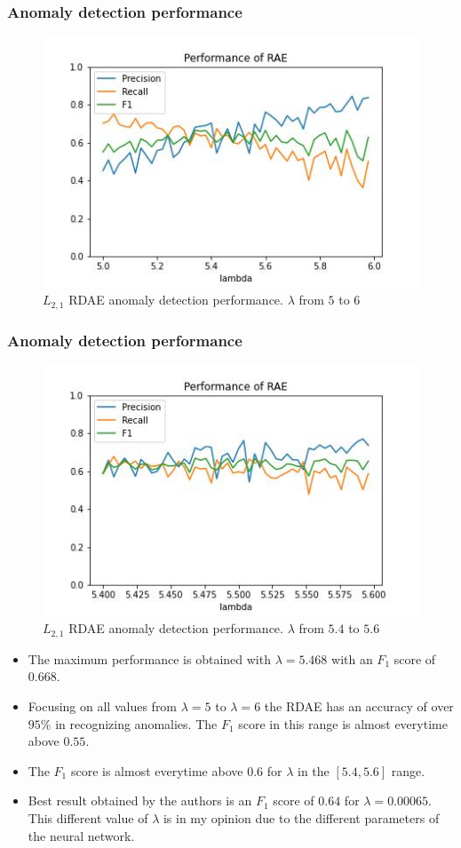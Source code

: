 \documentclass{beamer}
\theoremstyle{plain}
\theoremstyle{definition}
\theoremstyle{remark}
\begin{document}
\begin{frame}
	\frametitle{Anomaly detection performance}
	\begin{figure}
		\centering
		\includegraphics[width=0.8\linewidth]{Images/l21_experiment_from_5.0_to_6.0.jpg}
		\caption[]{$L_{2,1}$ RDAE anomaly detection performance. $\lambda$ from $5$ to $6$}
	\end{figure}
\end{frame}

\begin{frame}
	\frametitle{Anomaly detection performance}
	\begin{figure}
		\centering
		\includegraphics[width=0.8\linewidth]{Images/l21_experiment_from_5.4_to_5.6.jpg}
		\caption[]{$L_{2,1}$ RDAE anomaly detection performance. $\lambda$ from $5.4$ to $5.6$}
	\end{figure}
\end{frame}



\begin{frame}
	\begin{itemize}
		\item The maximum performance is obtained with $\lambda=5.468$ with an $F_1$ score of $0.668$.
		\item Focusing on all values from $\lambda=5$ to $\lambda=6$ the RDAE has an accuracy of over $95\%$ in recognizing anomalies. The $F_1$ score in this range is almost everytime above $0.55$.
		\item The $F_1$ score is almost everytime above $0.6$ for $\lambda$ in the $[5.4, 5.6]$ range.
		\item Best result obtained by the authors is an $F_1$ score of $0.64$ for $\lambda=0.00065$. This different value of $\lambda$ is in my opinion due to the different parameters of the neural network.
	\end{itemize}
\end{frame}
\end{document}
